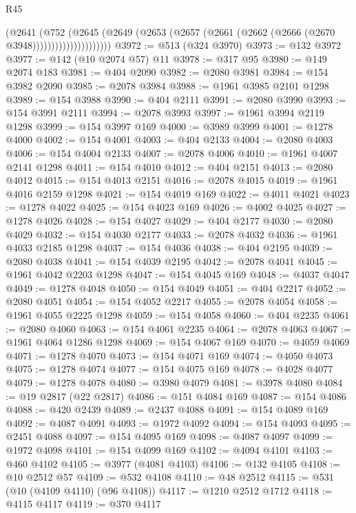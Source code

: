 \begin{lexlean}{R45}
\begin{coremodule}
                          (@2641
                            (@752
                              (@2645
                                (@2649
                                  (@2653
                                    (@2657 (@2661 (@2662 (@2666 (@2670 @3948)))))))))))))))))))))
@3972 := @513 (@324 @3970)
@3973 := @132 @3972
@3977 := @142 (@10 @2074 @57) @11
@3978 := @317 @95
@3980 := @149 @2074 @183
@3981 := @404 @2090
@3982 := @2080 @3981
@3984 := @154 @3982 @2090
@3985 := @2078 @3984
@3988 := @1961 @3985 @2101 @1298
@3989 := @154 @3988
@3990 := @404 @2111
@3991 := @2080 @3990
@3993 := @154 @3991 @2111
@3994 := @2078 @3993
@3997 := @1961 @3994 @2119 @1298
@3999 := @154 @3997 @169
@4000 := @3989 @3999
@4001 := @1278 @4000
@4002 := @154 @4001
@4003 := @404 @2133
@4004 := @2080 @4003
@4006 := @154 @4004 @2133
@4007 := @2078 @4006
@4010 := @1961 @4007 @2141 @1298
@4011 := @154 @4010
@4012 := @404 @2151
@4013 := @2080 @4012
@4015 := @154 @4013 @2151
@4016 := @2078 @4015
@4019 := @1961 @4016 @2159 @1298
@4021 := @154 @4019 @169
@4022 := @4011 @4021
@4023 := @1278 @4022
@4025 := @154 @4023 @169
@4026 := @4002 @4025
@4027 := @1278 @4026
@4028 := @154 @4027
@4029 := @404 @2177
@4030 := @2080 @4029
@4032 := @154 @4030 @2177
@4033 := @2078 @4032
@4036 := @1961 @4033 @2185 @1298
@4037 := @154 @4036
@4038 := @404 @2195
@4039 := @2080 @4038
@4041 := @154 @4039 @2195
@4042 := @2078 @4041
@4045 := @1961 @4042 @2203 @1298
@4047 := @154 @4045 @169
@4048 := @4037 @4047
@4049 := @1278 @4048
@4050 := @154 @4049
@4051 := @404 @2217
@4052 := @2080 @4051
@4054 := @154 @4052 @2217
@4055 := @2078 @4054
@4058 := @1961 @4055 @2225 @1298
@4059 := @154 @4058
@4060 := @404 @2235
@4061 := @2080 @4060
@4063 := @154 @4061 @2235
@4064 := @2078 @4063
@4067 := @1961 @4064 @1286 @1298
@4069 := @154 @4067 @169
@4070 := @4059 @4069
@4071 := @1278 @4070
@4073 := @154 @4071 @169
@4074 := @4050 @4073
@4075 := @1278 @4074
@4077 := @154 @4075 @169
@4078 := @4028 @4077
@4079 := @1278 @4078
@4080 := @3980 @4079
@4081 := @3978 @4080
@4084 := @19 @2817 (@22 @2817)
@4086 := @151 @4084 @169
@4087 := @154 @4086
@4088 := @420 @2439
@4089 := @2437 @4088
@4091 := @154 @4089 @169
@4092 := @4087 @4091
@4093 := @1972 @4092
@4094 := @154 @4093
@4095 := @2451 @4088
@4097 := @154 @4095 @169
@4098 := @4087 @4097
@4099 := @1972 @4098
@4101 := @154 @4099 @169
@4102 := @4094 @4101
@4103 := @460 @4102
@4105 := @3977 (@4081 @4103)
@4106 := @132 @4105
@4108 := @10 @2512 @57
@4109 := @532 @4108
@4110 := @48 @2512
@4115 := @531 (@10 (@4109 @4110) (@96 @4108))
@4117 := @1210 @2512 @1712
@4118 := @4115 @4117
@4119 := @370 @4117

\end{coremodule}
\end{lexlean}
